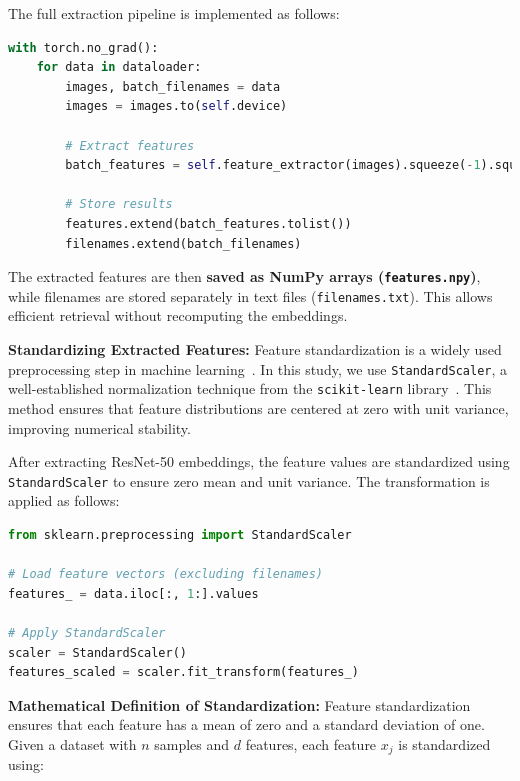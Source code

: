 \documentclass[nolibertine, english, algorithm, nomencl, minted]{ttlab-qualify}
\begin{document}
The full extraction pipeline is implemented as follows:

\begin{footnotesize}
\begin{lstlisting}[language=Python, frame=single, breaklines=true]
with torch.no_grad():
    for data in dataloader:
        images, batch_filenames = data
        images = images.to(self.device)

        # Extract features
        batch_features = self.feature_extractor(images).squeeze(-1).squeeze(-1)

        # Store results
        features.extend(batch_features.tolist())
        filenames.extend(batch_filenames)
\end{lstlisting}
\end{footnotesize}
The extracted features are then \textbf{saved as NumPy arrays (\texttt{features.npy})}, 
while filenames are stored separately in text files (\texttt{filenames.txt}). 
This allows efficient retrieval without recomputing the embeddings.

\noindent
\textbf{Standardizing Extracted Features:}
Feature standardization is a widely used preprocessing step in machine learning~\parencite{bishop2006pattern}. 
In this study, we use \texttt{StandardScaler}, a well-established normalization technique from 
the \texttt{scikit-learn} library~\parencite{scikit-learn}. This method ensures that feature distributions 
are centered at zero with unit variance, improving numerical stability.
  
After extracting ResNet-50 embeddings, the feature values are standardized using 
\texttt{StandardScaler} to ensure zero mean and unit variance. The transformation is applied as follows:

\begin{footnotesize}
\begin{lstlisting}[language=Python, frame=single, breaklines=true]
from sklearn.preprocessing import StandardScaler
        
# Load feature vectors (excluding filenames)
features_ = data.iloc[:, 1:].values  
        
# Apply StandardScaler
scaler = StandardScaler()
features_scaled = scaler.fit_transform(features_)
\end{lstlisting}
\end{footnotesize}

\noindent
\noindent
\textbf{Mathematical Definition of Standardization:}  
Feature standardization ensures that each feature has a mean of zero and a standard deviation of one. 
Given a dataset with \( n \) samples and \( d \) features, each feature \( x_j \) is standardized using:
\end{document}

